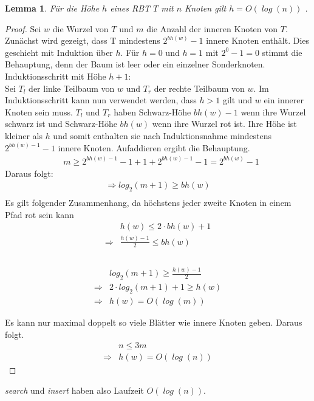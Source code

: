 \documentclass[a4paper,12pt]{article}
\newtheorem{Lemma}{Lemma}[section]
\begin{document}
\begin{Lemma} Für die Höhe $h$ eines RBT $T$ mit $n$ Knoten gilt $h = \mathit{O\left(\log \left(n\right)\right)}$ . 
\end{Lemma}
\begin{proof}
	Sei $w$ die Wurzel von $T$ und $m$ die Anzahl der inneren Knoten von $T$. 
	Zunächst wird gezeigt, dass T mindestens $2^\mathit{bh(w)} - 1$ innere Knoten enthält.
	Dies geschieht mit Induktion über $h$. Für $h = 0$ und  $h = 1$ mit $2^0 - 1 = 0 $ stimmt die Behauptung, denn der Baum ist leer oder ein einzelner Sonderknoten.  
	Induktionsschritt mit Höhe $h + 1$:\\
	Sei $T_l$ der linke Teilbaum von $w$ und $T_r$ der rechte Teilbaum von $w$.  
	Im Induktionsschritt kann nun verwendet werden, dass $h > 1$ gilt und $w$ ein innerer Knoten sein muss. $T_l$ und $T_r$ haben Schwarz-Höhe $\mathit{bh(w)} - 1$ wenn ihre Wurzel schwarz ist und Schwarz-Höhe $\mathit{bh(w)}$ wenn ihre Wurzel rot ist. Ihre Höhe ist kleiner als $h$ und somit enthalten sie nach Induktionsnahme mindestens  $2^\mathit{bh(w)- 1} - 1$ innere Knoten. Aufaddieren ergibt die Behauptung.\\    
	\begin{align*}
	&m \geq 2^\mathit{bh(w)- 1} - 1  + 1  + 2^\mathit{bh(w)- 1} - 1 = 2^\mathit{bh(w)} - 1
	\end{align*}
	Daraus folgt:\\
	\begin{align*}
	\Rightarrow  log_2(m + 1) \geq\mathit{bh(w)}\\ 
	\end{align*}
	\noindent Es gilt folgender Zusammenhang, da höchstens jeder zweite Knoten in einem Pfad rot sein kann\\
	\begin{align*}
	&\mathit{h(w)} \leq 2 \cdot \mathit{bh(w) } + 1 \\
	\Rightarrow &\frac{\mathit{h(w)} - 1}{2} \leq\mathit{bh(w) } \\
	\end{align*}
	\\
	\begin{align*}
	&log_2(m + 1) \geq\frac{\mathit{h(w)} - 1}{2} \\
	\Rightarrow	&2 \cdot log_2(m + 1) + 1 \geq\mathit{h(w)} \\
	\Rightarrow &\mathit{h(w)} = \mathit{O\left(\log \left( {m}\right)\right)} 
	\end{align*}
	
	
	
	
	
	
	\noindent Es kann nur maximal doppelt so viele Blätter wie innere Knoten geben. Daraus folgt.
	\begin{align*}
	&n  \leq 3 m \\
	\Rightarrow &\mathit{h(w)} = \mathit{O\left(\log \left({n}\right)\right)} 
	\end{align*} 
	
	
\end{proof}
\noindent \textit{search} und \textit{insert} haben also Laufzeit $\mathit{O\left(\log \left({n}\right)\right)}$.
\end{document}
